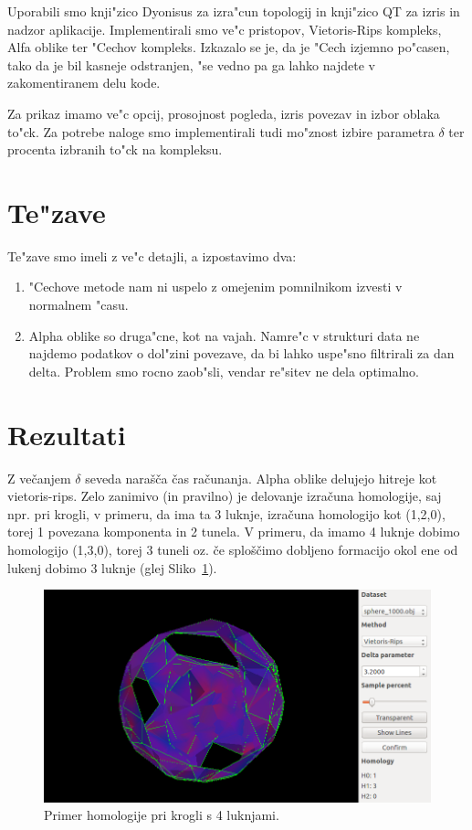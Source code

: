 \documentclass[11pt]{article}
\begin{document}
Uporabili smo knji"zico Dyonisus za izra"cun topologij in knji"zico QT za izris in nadzor aplikacije. Implementirali smo ve"c pristopov, Vietoris-Rips kompleks, Alfa oblike ter "Cechov kompleks. Izkazalo se je, da je "Cech izjemno po"casen, tako da je bil kasneje odstranjen, "se vedno pa ga lahko najdete v zakomentiranem delu kode.

Za prikaz imamo ve"c opcij, prosojnost pogleda, izris povezav in izbor oblaka to"ck. Za potrebe naloge smo implementirali tudi mo"znost izbire parametra $\delta$ ter procenta izbranih to"ck na kompleksu.

\section{Te"zave}

Te"zave smo imeli z ve"c detajli, a izpostavimo dva:

\begin{enumerate}
\item "Cechove metode nam ni uspelo z omejenim pomnilnikom izvesti v normalnem "casu.
\item Alpha oblike so druga"cne, kot na vajah. Namre"c v strukturi data ne najdemo podatkov o dol"zini povezave, da bi lahko uspe"sno filtrirali za dan delta. Problem smo rocno zaob"sli, vendar re"sitev ne dela optimalno.
\end{enumerate}

\section{Rezultati}

Z večanjem $\delta$ seveda narašča čas računanja. Alpha oblike delujejo hitreje kot vietoris-rips. Zelo zanimivo (in pravilno) je delovanje izračuna homologije, saj npr. pri krogli, v primeru, da ima ta 3 luknje, izračuna homologijo kot (1,2,0), torej 1 povezana komponenta in 2 tunela. V primeru, da imamo 4 luknje dobimo homologijo (1,3,0), torej 3 tuneli oz. če sploščimo dobljeno formacijo okol ene od lukenj dobimo 3 luknje (glej Sliko~\ref{lukne}).

\begin{figure}[htb]
    \centering
    \includegraphics[width=1\textwidth]{lukne_primer.png}
    \caption{Primer homologije pri krogli s 4 luknjami.}
    \label{lukne}
\end{figure}
\end{document}
